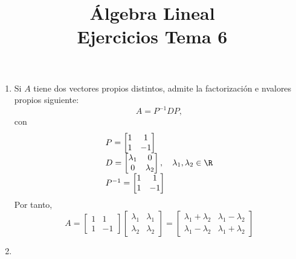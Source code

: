 
\title{Álgebra Lineal\\Ejercicios Tema 6}


\maketitle
\begin{enumerate}[label=\color{red}\textbf{\arabic*)}]
    \item {} 

        Si $A$ tiene dos vectores propios distintos, admite la factorización e nvalores propios siguiente:  \[
        A=P^{-1}DP,
        \]con \[
        \begin{array}{l}
            P=\begin{bmatrix} 
                1 & 1 \\ 1 & -1 
            \end{bmatrix} \\
            D=\begin{bmatrix} 
                \lambda_1 & 0\\ 0 & \lambda_2 
            \end{bmatrix} ,\quad \lambda_1,\lambda_2\in \R\\
            P^{-1}=\begin{bmatrix} 
                1 & 1\\ 1  & -1
            \end{bmatrix} 
        \end{array}
        \]  
        Por tanto, \[
        A=\begin{bmatrix} 
            1 & 1\\ 1 & -1 
        \end{bmatrix} \begin{bmatrix} 
            \lambda_1 & \lambda_1\\
            \lambda_2 & \lambda_2
        \end{bmatrix} =\begin{bmatrix} 
            \lambda_1+\lambda_2 & \lambda_1-\lambda_2\\
            \lambda_1-\lambda_2 & \lambda_1+\lambda_2
        \end{bmatrix} 
        \] 
    \item {}


\end{enumerate}
